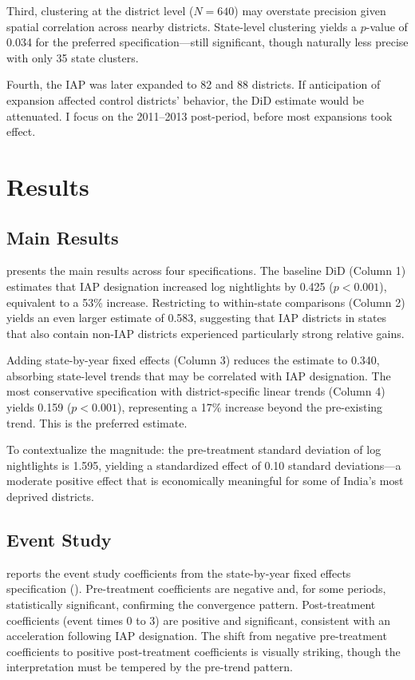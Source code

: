 \documentclass[12pt]{article}
\begin{document}
Third, clustering at the district level ($N = 640$) may overstate precision given spatial correlation across nearby districts. State-level clustering yields a $p$-value of 0.034 for the preferred specification---still significant, though naturally less precise with only 35 state clusters.

Fourth, the IAP was later expanded to 82 and 88 districts. If anticipation of expansion affected control districts' behavior, the DiD estimate would be attenuated. I focus on the 2011--2013 post-period, before most expansions took effect.

\section{Results}

\subsection{Main Results}



 presents the main results across four specifications. The baseline DiD (Column 1) estimates that IAP designation increased log nightlights by 0.425 ($p < 0.001$), equivalent to a 53\% increase. Restricting to within-state comparisons (Column 2) yields an even larger estimate of 0.583, suggesting that IAP districts in states that also contain non-IAP districts experienced particularly strong relative gains.

Adding state-by-year fixed effects (Column 3) reduces the estimate to 0.340, absorbing state-level trends that may be correlated with IAP designation. The most conservative specification with district-specific linear trends (Column 4) yields 0.159 ($p < 0.001$), representing a 17\% increase beyond the pre-existing trend. This is the preferred estimate.

To contextualize the magnitude: the pre-treatment standard deviation of log nightlights is 1.595, yielding a standardized effect of 0.10 standard deviations---a moderate positive effect that is economically meaningful for some of India's most deprived districts.

\subsection{Event Study}



 reports the event study coefficients from the state-by-year fixed effects specification (). Pre-treatment coefficients are negative and, for some periods, statistically significant, confirming the convergence pattern. Post-treatment coefficients (event times 0 to 3) are positive and significant, consistent with an acceleration following IAP designation. The shift from negative pre-treatment coefficients to positive post-treatment coefficients is visually striking, though the interpretation must be tempered by the pre-trend pattern.
\end{document}
